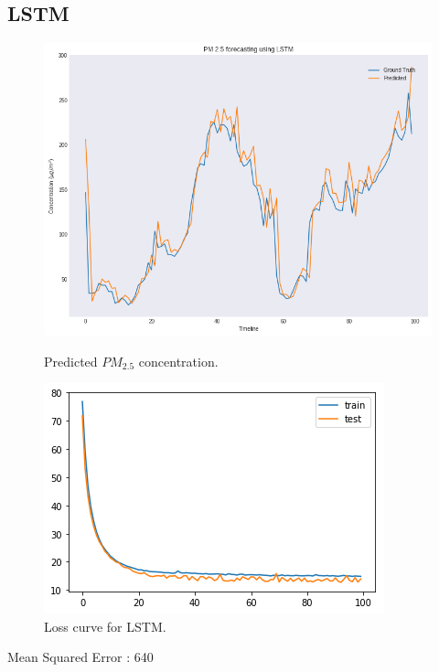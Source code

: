\documentclass{report}
\begin{document}
\subsection{LSTM}
\begin{figure}[htbp]
	\centering
	\includegraphics[scale=0.5]{Images/lstm}
	\caption{Predicted $PM_{2.5}$ concentration.}
	\label{fig}

	\centering
	\includegraphics[scale=0.65]{Images/lstm_loss}
	\caption{Loss curve for LSTM.}
	\label{fig}
\end{figure}	
Mean Squared Error : 640
\newpage
\end{document}
